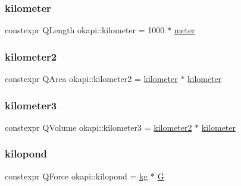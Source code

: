 \subsubsection{\texorpdfstring{kilometer}{kilometer}}
{\footnotesize\ttfamily constexpr Q\+Length okapi\+::kilometer = 1000 $\ast$ \mbox{\hyperlink{namespaceokapi_a59563b3d4b18633f1c8d852e2932d1db}{meter}}}

\mbox{\label{namespaceokapi_a9760b46c22212bb946c9936f6a600455}} 
\subsubsection{\texorpdfstring{kilometer2}{kilometer2}}
{\footnotesize\ttfamily constexpr Q\+Area okapi\+::kilometer2 = \mbox{\hyperlink{namespaceokapi_a05acd5fc8bdc7fe19d03a5241ae4bbc7}{kilometer}} $\ast$ \mbox{\hyperlink{namespaceokapi_a05acd5fc8bdc7fe19d03a5241ae4bbc7}{kilometer}}}

\mbox{\label{namespaceokapi_a8d66a33d9f8e743e53655cffaac14059}} 
\subsubsection{\texorpdfstring{kilometer3}{kilometer3}}
{\footnotesize\ttfamily constexpr Q\+Volume okapi\+::kilometer3 = \mbox{\hyperlink{namespaceokapi_a9760b46c22212bb946c9936f6a600455}{kilometer2}} $\ast$ \mbox{\hyperlink{namespaceokapi_a05acd5fc8bdc7fe19d03a5241ae4bbc7}{kilometer}}}

\mbox{\label{namespaceokapi_ab3d807584cdc64b88f3d3c31fa571f9e}} 
\subsubsection{\texorpdfstring{kilopond}{kilopond}}
{\footnotesize\ttfamily constexpr Q\+Force okapi\+::kilopond = \mbox{\hyperlink{namespaceokapi_afcc67eb55c70e21f82cbee49aa19d05a}{kg}} $\ast$ \mbox{\hyperlink{namespaceokapi_a6e00ff72f863a56a3fc99ca94f106a5a}{G}}}

\mbox{\label{namespaceokapi_af18e23455e066dcbca14e9b674f2473b}} 
